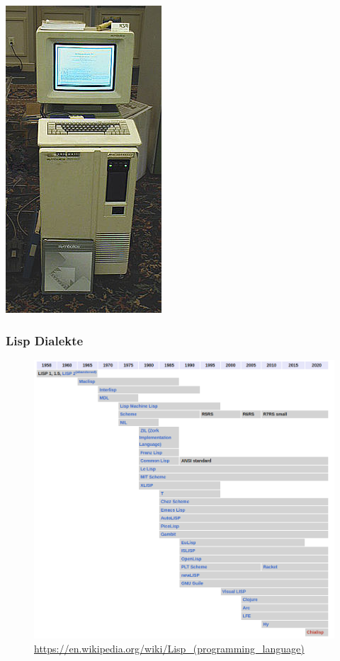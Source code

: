 \documentclass{beamer}
\begin{document}
\begin{frame}
\begin{itemize}
            \includegraphics[scale=0.1]{bilder/symblics.jpeg}
	\end{itemize}

\end{frame}

\begin{frame}
\frametitle{Lisp Dialekte}
	\begin{figure}
	    \centering
	    \includegraphics[width=0.7\linewidth]{bilder/lisphis.png}
            \textmd{ \tiny \url{https://en.wikipedia.org/wiki/Lisp_(programming_language)}}
	\end{figure}
\end{frame}
\end{document}
